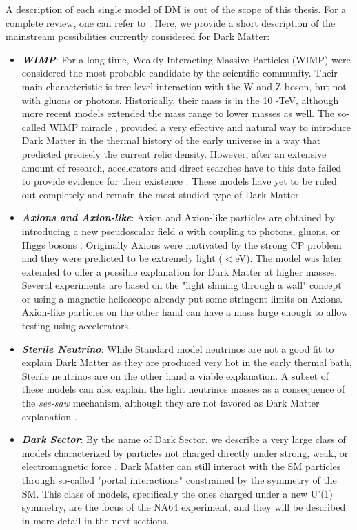 A description of each single model of DM is out of the scope of this thesis. For a complete review, one can refer to \cite{battaglieri2017cosmic,Profumo:2019ujg,HAMBYE2020135553,alex2016dark,review-particle-physics,Feng:2010gw}. Here, we provide a short description of the mainstream possibilities currently considered for Dark Matter:
\begin{itemize}
\item \textbf{\textit{WIMP}}: For a long time, Weakly Interacting Massive Particles (WIMP) were considered the most probable candidate by the scientific community. Their main characteristic is tree-level interaction with the W and Z boson, but not with gluons or photons. Historically, their mass is in the 10 \gev-\si{\tera\electronvolt}, although more recent models extended the mass range to lower masses as well. The so-called WIMP miracle \cite{Chang:2013oia}, provided a very effective and natural way to introduce Dark Matter in the thermal history of the early universe in a way that predicted precisely the current relic density. However, after an extensive amount of research, accelerators and direct searches have to this date failed to provide evidence for their existence \cite{Arcadi:2017kky}. These models have yet to be ruled out completely and remain the most studied type of Dark Matter.
\item \textbf{\textit{Axions and Axion-like}}: Axion and Axion-like particles are obtained by introducing a new pseudoscalar field $a$ with coupling to photons, gluons, or Higgs bosons \cite{Marsh:2015xka}. Originally Axions were motivated by the strong CP problem and they were predicted to be extremely light ($<$\si{\electronvolt}). The model was later extended to offer a possible explanation for Dark Matter at higher masses. Several experiments are based on the "light shining through a wall" concept or using a magnetic helioscope \cite{annurev.nucl.56.080805.140513} already put some stringent limits on Axions. Axion-like particles on the other hand can have a mass large enough to allow testing using accelerators.
\item \textbf{\textit{Sterile Neutrino}}: While Standard model neutrinos are not a good fit to explain Dark Matter as they are produced very hot in the early thermal bath, Sterile neutrinos are on the other hand a viable explanation. A subset of these models can also explain the light neutrinos masses as a consequence of the \textit{see-saw} mechanism, although they are not favored as Dark Matter explanation \cite{Feng:2010gw}. 
\item \textbf{\textit{Dark Sector}}: By the name of Dark Sector, we describe a very large class of models characterized by particles not charged directly under strong, weak, or electromagnetic force \cite{alex2016dark}. Dark Matter can still interact with the SM particles through so-called "portal interactions" constrained by the symmetry of the SM. This class of models, specifically the ones charged under a new U'(1) symmetry, are the focus of the NA64 experiment, and they will be described in more detail in the next sections.
\end{itemize}

